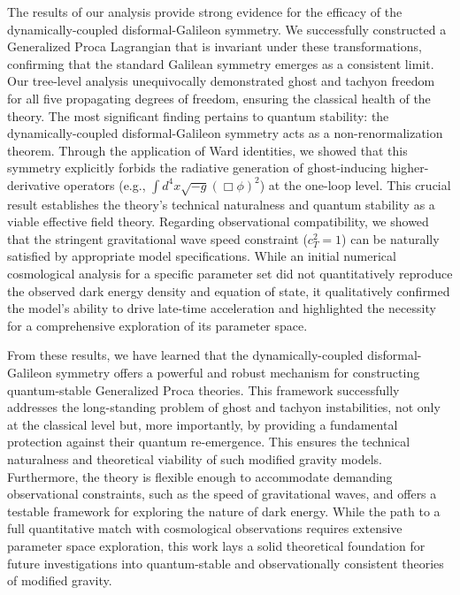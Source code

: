 \documentclass[twocolumn]{aastex631}
\begin{document}
The results of our analysis provide strong evidence for the efficacy of the dynamically-coupled disformal-Galileon symmetry. We successfully constructed a Generalized Proca Lagrangian that is invariant under these transformations, confirming that the standard Galilean symmetry emerges as a consistent limit. Our tree-level analysis unequivocally demonstrated ghost and tachyon freedom for all five propagating degrees of freedom, ensuring the classical health of the theory. The most significant finding pertains to quantum stability: the dynamically-coupled disformal-Galileon symmetry acts as a non-renormalization theorem. Through the application of Ward identities, we showed that this symmetry explicitly forbids the radiative generation of ghost-inducing higher-derivative operators (e.g., $\int d^4x \sqrt{-g} (\Box \phi)^2$) at the one-loop level. This crucial result establishes the theory's technical naturalness and quantum stability as a viable effective field theory. Regarding observational compatibility, we showed that the stringent gravitational wave speed constraint ($c_T^2=1$) can be naturally satisfied by appropriate model specifications. While an initial numerical cosmological analysis for a specific parameter set did not quantitatively reproduce the observed dark energy density and equation of state, it qualitatively confirmed the model's ability to drive late-time acceleration and highlighted the necessity for a comprehensive exploration of its parameter space.

From these results, we have learned that the dynamically-coupled disformal-Galileon symmetry offers a powerful and robust mechanism for constructing quantum-stable Generalized Proca theories. This framework successfully addresses the long-standing problem of ghost and tachyon instabilities, not only at the classical level but, more importantly, by providing a fundamental protection against their quantum re-emergence. This ensures the technical naturalness and theoretical viability of such modified gravity models. Furthermore, the theory is flexible enough to accommodate demanding observational constraints, such as the speed of gravitational waves, and offers a testable framework for exploring the nature of dark energy. While the path to a full quantitative match with cosmological observations requires extensive parameter space exploration, this work lays a solid theoretical foundation for future investigations into quantum-stable and observationally consistent theories of modified gravity.
\end{document}
